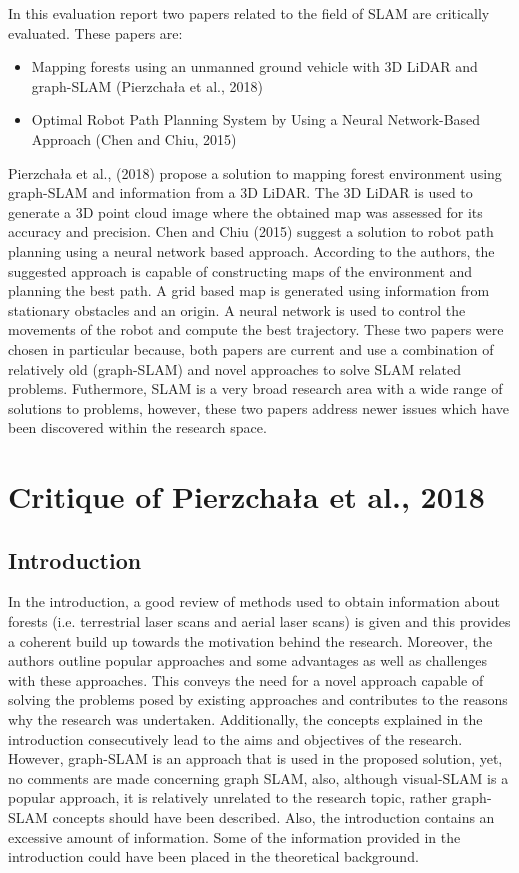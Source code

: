 \documentclass[a4paper, 12pt]{article}
\begin{document}
In this evaluation report two papers related to the field of SLAM are critically evaluated. These papers are: 

\begin{itemize}
 \item{Mapping forests using an unmanned ground vehicle with 3D LiDAR and graph-SLAM (Pierzchała et al., 2018)}
 \item{Optimal Robot Path Planning System by Using a Neural Network-Based Approach (Chen and Chiu, 2015)}
\end{itemize}

 Pierzchała et al., (2018) propose a solution to mapping forest environment using graph-SLAM and information from a 3D LiDAR. The 3D LiDAR is used to generate a 3D point cloud image where the obtained map was assessed for its accuracy and precision. Chen and Chiu (2015) suggest a solution to robot path planning using a neural network based approach. According to the authors, the suggested approach is capable of constructing maps of the environment and planning the best path. A grid based map is generated using information from stationary obstacles and an origin. A neural network is used to control the movements of the robot and compute the best trajectory. These two papers were chosen in particular because, both papers are current and use a combination of relatively old (graph-SLAM) and novel approaches to solve SLAM related problems. Futhermore, SLAM is a very broad research area with a wide range of solutions to problems, however, these two papers address newer issues which have been discovered within the research space. 

\newpage 
\section{Critique of Pierzchała et al., 2018}

\subsection{Introduction}
In the introduction, a good review of methods used to obtain information about forests (i.e. terrestrial laser scans and aerial laser scans) is given and this provides a coherent build up towards the motivation behind the research. Moreover, the authors outline popular approaches and some advantages as well as  challenges with these approaches. This conveys the need for a novel approach capable of solving the problems posed by existing approaches and contributes to the reasons why the research was undertaken. Additionally, the concepts explained in the introduction consecutively lead to the aims and objectives of the research. However, graph-SLAM is an approach that is used in the proposed solution, yet, no comments are made concerning graph SLAM, also, although visual-SLAM is a popular approach, it is relatively unrelated to the research topic, rather graph-SLAM concepts should have been described. Also, the introduction contains an excessive amount of information. Some of the information provided in the introduction could have been placed in the theoretical background.
\end{document}
